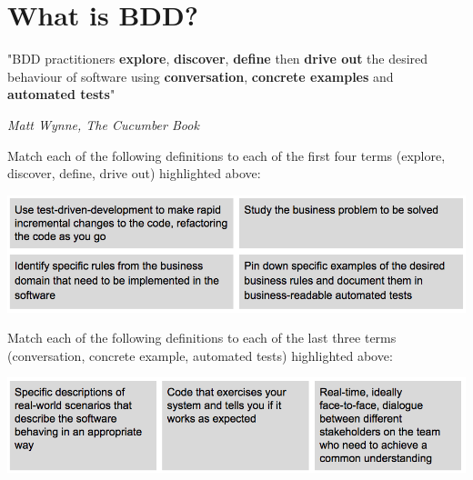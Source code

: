 \chapter*{What is BDD?}

\begin{framed}
    "BDD practitioners \textbf{explore}, \textbf{discover}, \textbf{define} then \textbf{drive out} the desired behaviour of software using \textbf{conversation}, \textbf{concrete examples} and \textbf{automated tests}"
    \begin{flushright}
        \textit{Matt Wynne, The Cucumber Book}
    \end{flushright}
\end{framed}

Match each of the following definitions to each of the first four terms (explore, discover, define, drive out) highlighted above:

    \includegraphics[width=\textwidth]{images/bdd-activities}

Match each of the following definitions to each of the last three terms (conversation, concrete example, automated tests) highlighted above:

    \includegraphics[width=\textwidth]{images/bdd-artefacts}
